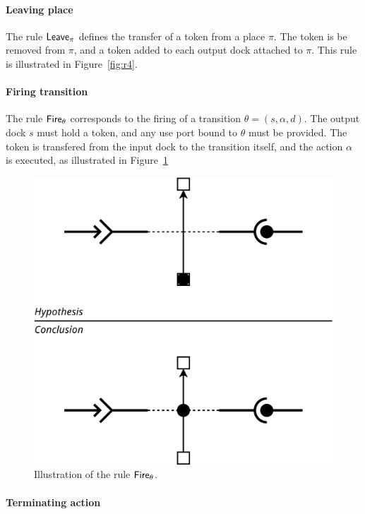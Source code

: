 {\begin{figure}[t]
\begin{minipage}[h]{0.45\columnwidth}
\end{minipage}
\end{figure}

\paragraph{Leaving place}{
  
The rule $\mathsf{Leave}_\pi$ defines the transfer of a token from a place
$\pi$. The token is be removed from $\pi$, and a token added to each
output dock attached to $\pi$. This rule is illustrated in
Figure~\ref{fig:r4}.

}

\paragraph{Firing transition}{

The rule $\mathsf{Fire}_\theta$ corresponds to the firing of a transition
$\theta = (s, \alpha, d)$. The output dock $s$ must hold a token, and
any use port bound to $\theta$ must be provided. The token is
transfered from the input dock to the transition itself, and the
action $\alpha$ is executed, as illustrated in Figure~\ref{fig:r1}

\begin{figure}[t]
\begin{center}
  \includegraphics[width=0.55\columnwidth]{./images/firing.pdf}
\end{center}
\caption{Illustration of the rule $\mathsf{Fire}_\theta$.}
\label{fig:r1}
\end{figure}

}

\paragraph{Terminating action}{

}}
